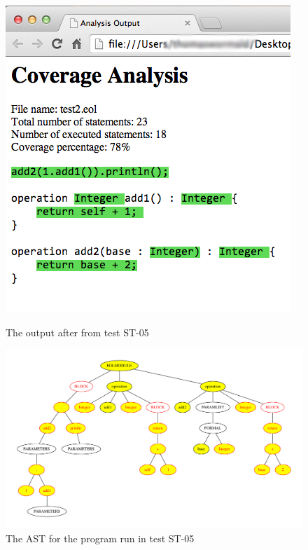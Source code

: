 \begin{figure}
\centering
\begin{minipage}[b]{.44\textwidth}
  \centering
  \includegraphics[width=0.6\linewidth]{figures/ST05HTML.png}
  \caption{The output after from test ST-05\\}
  \label{fig:ST05HTML}
\end{minipage}%
\begin{minipage}[b]{.1\textwidth}
\hspace{3.00mm}
\end{minipage}
\begin{minipage}[b]{.44\textwidth}
  \centering
  \includegraphics[width=\linewidth]{figures/ST05AST.pdf}
  \caption{The AST for the program run in test ST-05}
  \label{fig:ST05AST}
\end{minipage}
\end{figure}
